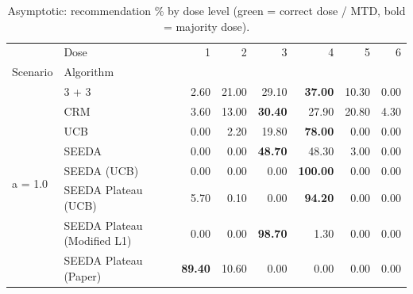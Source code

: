 \begin{table}[H]
\centering
\caption{Asymptotic: recommendation \% by dose level (green = correct dose / MTD, bold = majority dose).}
\label{tab:asym_rec_by_dose}
\begin{tabular}{llrrrrrr}
\toprule
 & Dose & 1 & 2 & 3 & 4 & 5 & 6 \\
Scenario & Algorithm &  &  &  &  &  &  \\
\midrule
\multirow[c]{8}{*}{a = 1.0} & 3 + 3 & 2.60 & 21.00 & {\cellcolor[HTML]{C8E6C9}} 29.10 & \bfseries 37.00 & 10.30 & 0.00 \\
 & CRM & 3.60 & 13.00 & {\cellcolor[HTML]{C8E6C9}} \bfseries 30.40 & 27.90 & 20.80 & 4.30 \\
 & UCB & 0.00 & 2.20 & {\cellcolor[HTML]{C8E6C9}} 19.80 & \bfseries 78.00 & 0.00 & 0.00 \\
 & SEEDA & 0.00 & 0.00 & {\cellcolor[HTML]{C8E6C9}} \bfseries 48.70 & 48.30 & 3.00 & 0.00 \\
 & SEEDA (UCB) & 0.00 & 0.00 & {\cellcolor[HTML]{C8E6C9}} 0.00 & \bfseries 100.00 & 0.00 & 0.00 \\
 & SEEDA Plateau (UCB) & 5.70 & 0.10 & {\cellcolor[HTML]{C8E6C9}} 0.00 & \bfseries 94.20 & 0.00 & 0.00 \\
 & SEEDA Plateau (Modified L1) & 0.00 & 0.00 & {\cellcolor[HTML]{C8E6C9}} \bfseries 98.70 & 1.30 & 0.00 & 0.00 \\
 & SEEDA Plateau (Paper) & \bfseries 89.40 & 10.60 & {\cellcolor[HTML]{C8E6C9}} 0.00 & 0.00 & 0.00 & 0.00 \\
\bottomrule
\end{tabular}
\end{table}
